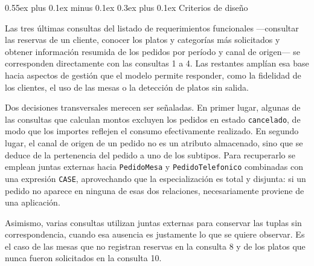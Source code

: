 \documentclass[conference,a4paper,10pt]{IEEEtran}
\makeatletter
\def\subsection{\@startsection{subsection}{2}{\z@}
{0.55ex plus 0.1ex minus 0.1ex}
{0.3ex plus 0.1ex}
{\normalfont\small\bfseries}}
\makeatother
\begin{document}
\subsection{Criterios de diseño}

Las tres últimas consultas del listado de requerimientos funcionales ---consultar las reservas de un cliente, conocer los platos y categorías más solicitados y obtener información resumida de los pedidos por período y canal de origen--- se corresponden directamente con las consultas 1 a 4. Las restantes amplían esa base hacia aspectos de gestión que el modelo permite responder, como la fidelidad de los clientes, el uso de las mesas o la detección de platos sin salida.

Dos decisiones transversales merecen ser señaladas. En primer lugar, algunas de las consultas que calculan montos excluyen los pedidos en estado \texttt{cancelado}, de modo que los importes reflejen el consumo efectivamente realizado. En segundo lugar, el canal de origen de un pedido no es un atributo almacenado, sino que se deduce de la pertenencia del pedido a uno de los subtipos. Para recuperarlo se emplean juntas externas hacia \texttt{PedidoMesa} y \texttt{PedidoTelefonico} combinadas con una expresión \texttt{CASE}, aprovechando que la especialización es total y disjunta: si un pedido no aparece en ninguna de esas dos relaciones, necesariamente proviene de una aplicación.

Asimismo, varias consultas utilizan juntas externas para conservar las tuplas sin correspondencia, cuando esa ausencia es justamente lo que se quiere observar. Es el caso de las mesas que no registran reservas en la consulta 8 y de los platos que nunca fueron solicitados en la consulta 10.


\end{document}
